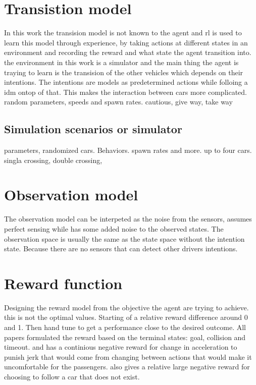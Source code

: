 \section{Transistion model}
In this work the transision model is not known to the agent and \gls{rl} is used to learn this model through experience, by taking actions at different states in an environment and recording the reward and what state the agent transition into.
the environment in this work is a simulator and the main thing the agent is traying to learn is the transision of the other vehicles which depends on their intentions. 
The intentions are models as predetermined actions while folloing a \gls{idm} ontop of that. This makes the interaction between cars more complicated. 
\paperLSTM random parameters, speeds and spawn rates. 
\paperMPC cautious, give way, take way


\subsection{Simulation scenarios or simulator}
parameters, randomized cars. Behaviors. spawn rates and more. up to four cars. 
singla crossing, double crossing, 

\section{Observation model}
The observation model can be interpeted as the noise from the sensors, \paperLSTM assumes perfect sensing while \paperBelief has some added noise to the observed states. 
The observation space is usually the same as the state space without the intention state. Because there are no sensors that can detect other drivers intentions. 

\section{Reward function}
Designing the reward model from the objective the agent are trying to achieve. this is not the optimal values. Starting of a relative reward difference around 0 and 1. Then hand tune to get a performance close to the desired outcome. 
All papers formulated the reward based on the terminal states: goal, collision and timeout. 
\paperLSTM and \paperMPC has a continious negative reward for change in acceleration to punish jerk that would come from changing between actions that would make it uncomfortable for the passengers. 
\paperLSTM also gives a relative large negative reward for choosing to follow a car that does not exist. 
